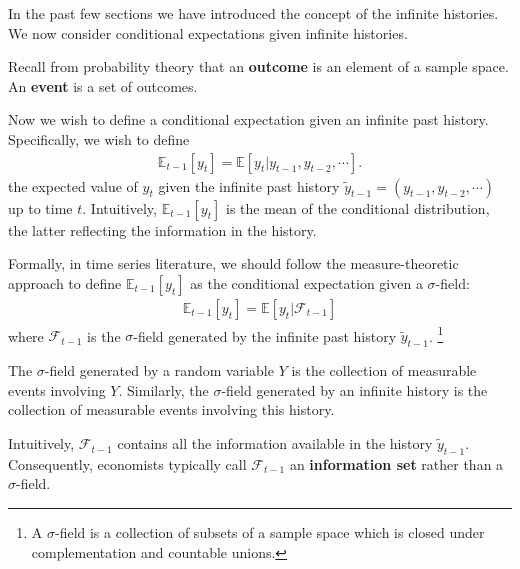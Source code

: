 In the past few sections we have introduced the concept of the infinite histories. We now consider
conditional expectations given infinite histories.

Recall from probability theory that an \textbf{outcome} is an element of a sample space.
An \textbf{event} is a set of outcomes.

Now we wish to define a conditional expectation given an infinite past history. Specifically, we wish
to define
\begin{gather*}
    \mathbb{E}_{t-1}[y_t] = \mathbb{E}\left[y_t | y_{t-1}, y_{t-2}, \cdots \right].
\end{gather*}
the expected value of $y_t$ given the infinite past history $\tilde{y}_{t-1} = (y_{t-1}, y_{t-2}, \cdots)$ up to time $t$.
Intuitively, $\mathbb{E}_{t-1}[y_t]$ is the mean of the conditional distribution, the latter reflecting the information in the history.

Formally, in time series literature, we should follow the measure-theoretic approach to define $\mathbb{E}_{t-1}[y_t]$ as 
the conditional expectation given a $\sigma$-field:
\begin{gather*}
    \mathbb{E}_{t-1}[y_t] = \mathbb{E}\left[y_t | \mathcal{F}_{t-1} \right]
\end{gather*}
where $\mathcal{F}_{t-1}$ is the $\sigma$-field generated by the infinite past history $\tilde{y}_{t-1}$.
\footnote{A $\sigma$-field is a collection of subsets of a sample space which is closed under complementation and countable unions.}

The $\sigma$-field generated by a random variable $Y$ is the collection of measurable events involving $Y$.
Similarly, the $\sigma$-field generated by an infinite history is the collection of measurable events involving this history.

Intuitively, $\mathcal{F}_{t-1}$ contains all the information available in the history $\tilde{y}_{t-1}$.
Consequently, economists typically call $\mathcal{F}_{t-1}$ an \textbf{information set} rather than a $\sigma$-field.

